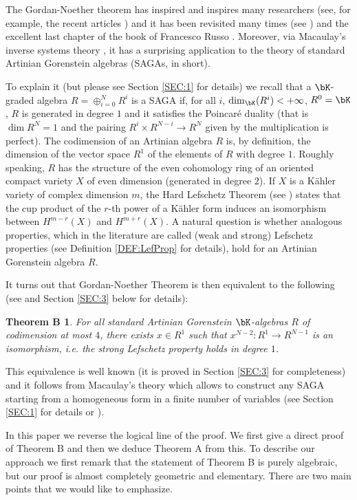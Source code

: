 \documentclass[a4paper,11pt]{amsart}
\newtheorem*{thB}{Theorem B}
\begin{document}
The Gordan-Noether theorem has inspired and inspires many researchers (see, for example, the recent articles \cite{CO20,DS21}) and it has been revisited many times (see \cite{Los04,GR09,Wa20}) and the excellent last chapter of the book of Francesco Russo \cite{Rus16}. Moreover, via  Macaulay's inverse systems theory \cite{Mac94}, it has a surprising application to the theory of standard Artinian Gorenstein algebras (SAGAs, in short).

To explain it (but please see Section \ref{SEC:1} for details) we recall that a  $\bK$-graded algebra $R=\oplus_{i=0}^N R^i$ is a SAGA if, for all $i$, 
$\dim_{\bK}(R^i) < +\infty$, $R^0=\bK$,
$R$ is generated in degree $1$ and it satisfies the Poincar\'e duality (that is $\dim R^N=1$ and the pairing $R^i\times R^{N-i}\to R^N$ given by the multiplication is perfect).
The codimension of an Artinian algebra $R$ is, by definition, the dimension of the vector space $R^1$ of the elements of $R$ with degree $1$. 
Roughly speaking, $R$ has the structure of the even cohomology ring of an oriented compact variety $X$ of even dimension (generated in degree $2$). 
If $X$ is a K\"ahler variety of complex dimension $m$, the Hard Lefschetz Theorem (see \cite[Theorem 6.25, page 148]{textVoi1}) states that the cup product of the $r$-th power of a K\"ahler form induces an isomorphism between $H^{m-r}(X)$ and $H^{m+r}(X)$. A natural question is whether analogous properties, which in the literature are called (weak and strong) Lefschetz properties (see Definition \ref{DEF:LefProp} for details), hold for an Artinian Gorenstein algebra $R$.

It turns out that Gordan-Noether Theorem is then equivalent to the following (see \cite{Rus16,bookLef} and Section \ref{SEC:3} below for details):

\begin{thB} 
For all standard Artinian Gorenstein $\bK$-algebras $R$ of codimension at most $4$,
there exists $x\in R^1$ such that $x^{N-2}:R^1\to R^{N-1}$ is an isomorphism, i.e. the strong Lefschetz property holds in degree $1$.
\end{thB}

This equivalence is well known (it is proved in Section \ref{SEC:3} for completeness) and it follows from Macaulay's theory which allows to construct any SAGA starting from a homogeneous form in a finite number of variables (see Section \ref{SEC:1} for details or \cite[Theorem 2.71]{bookLef}).
\medskip

In this paper we reverse the logical line of the proof. We first give a direct proof of Theorem B and then we deduce Theorem A from this.  
To describe our approach we first remark that the statement of Theorem B is purely algebraic, but our proof is almost completely geometric and elementary. There are two main points that we would like to emphasize.
\medskip
\end{document}
